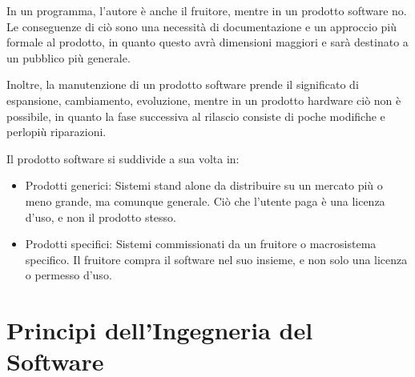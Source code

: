     In un programma, l'autore è anche il fruitore, mentre in un prodotto software no. Le conseguenze di ciò sono una necessità di documentazione e un approccio più formale al prodotto, in quanto questo avrà dimensioni maggiori e sarà destinato a un pubblico più generale.
    
    Inoltre, la manutenzione di un prodotto software prende il significato di espansione, cambiamento, evoluzione, mentre in un prodotto hardware ciò non è possibile, in quanto la fase successiva al rilascio consiste di poche modifiche e perlopiù riparazioni.
    
    Il prodotto software si suddivide a sua volta in:
    \begin{itemize}
        \item Prodotti generici: Sistemi stand alone da distribuire su un mercato più o meno grande, ma comunque generale. Ciò che l'utente paga è una licenza d'uso, e non il prodotto stesso.
        \item Prodotti specifici: Sistemi commissionati da un fruitore o macrosistema specifico. Il fruitore compra il software nel suo insieme, e non solo una licenza o permesso d'uso.
    \end{itemize}
    
    
\section{Principi dell'Ingegneria del Software}
    
